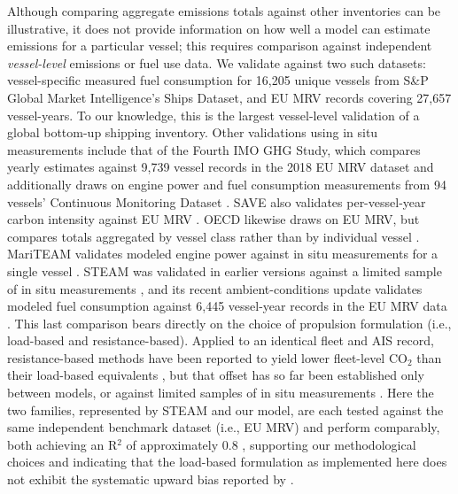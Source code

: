 Although comparing aggregate emissions totals against other inventories can be illustrative, it does not provide information on how well a model can estimate emissions for a particular vessel; this requires comparison against independent \textit{vessel-level} emissions or fuel use data. We validate against two such datasets: vessel-specific measured fuel consumption for 16,205 unique vessels from S\&P Global Market Intelligence's Ships Dataset, and EU MRV records covering 27,657 vessel-years. To our knowledge, this is the largest vessel-level validation of a global bottom-up shipping inventory. Other validations using in situ measurements include that of the Fourth IMO GHG Study, which compares yearly estimates against 9,739 vessel records in the 2018 EU MRV dataset and additionally draws on engine power and fuel consumption measurements from 94 vessels' Continuous Monitoring Dataset \cite{fourth2020greenhouse}. SAVE also validates per-vessel-year carbon intensity against EU MRV \cite{documentationV2025031Documentation}. OECD likewise draws on EU MRV, but compares totals aggregated by vessel class rather than by individual vessel \cite{oecdMaritimeTransportCO2Methodology2025}. MariTEAM validates modeled engine power against in situ measurements for a single vessel \cite{kramelGlobalShippingEmissions2021}. STEAM was validated in earlier versions against a limited sample of in situ measurements \cite{bergShipEmissionsSO22012}, and its recent ambient-conditions update validates modeled fuel consumption against 6,445 vessel-year records in the EU MRV data \cite{majamaki2025improving}. This last comparison bears directly on the choice of propulsion formulation (i.e., load-based and resistance-based). Applied to an identical fleet and AIS record, resistance-based methods have been reported to yield lower fleet-level CO$_{2}$ than their load-based equivalents \cite{brownPowerModelsAverage2019}, but that offset has so far been established only between models, or against limited samples of in situ measurements \cite{bergShipEmissionsSO22012, kramelGlobalShippingEmissions2021}. Here the two families, represented by STEAM and our model, are each tested against the same independent benchmark dataset (i.e., EU MRV) and perform comparably, both achieving an R$^{2}$ of approximately 0.8 \cite{majamaki2025improving}, supporting our methodological choices and indicating that the load-based formulation as implemented here does not exhibit the systematic upward bias reported by \cite{brownPowerModelsAverage2019}.



